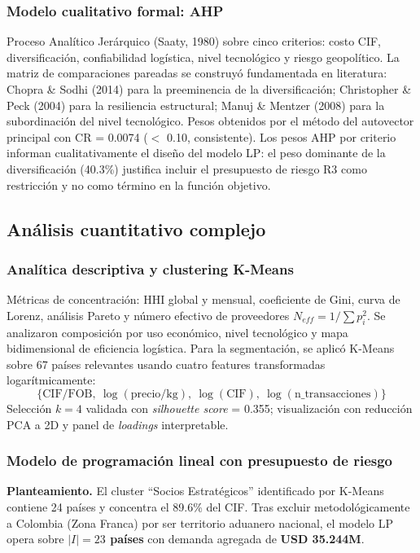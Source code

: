 \documentclass[11pt,a4paper]{article}
\begin{document}
\subsubsection{Modelo cualitativo formal: AHP}

Proceso Analítico Jerárquico (Saaty, 1980) sobre cinco criterios: costo CIF, diversificación, confiabilidad logística, nivel tecnológico y riesgo geopolítico. La matriz de comparaciones pareadas se construyó fundamentada en literatura: Chopra \& Sodhi (2014) para la preeminencia de la diversificación; Christopher \& Peck (2004) para la resiliencia estructural; Manuj \& Mentzer (2008) para la subordinación del nivel tecnológico. Pesos obtenidos por el método del autovector principal con CR = 0.0074 ($<$ 0.10, consistente). Los pesos AHP por criterio informan cualitativamente el diseño del modelo LP: el peso dominante de la diversificación (40.3\%) justifica incluir el presupuesto de riesgo R3 como restricción y no como término en la función objetivo.

\subsection{Análisis cuantitativo complejo}

\subsubsection{Analítica descriptiva y clustering K-Means}

Métricas de concentración: HHI global y mensual, coeficiente de Gini, curva de Lorenz, análisis Pareto y número efectivo de proveedores $N_{eff} = 1/\sum p_i^2$. Se analizaron composición por uso económico, nivel tecnológico y mapa bidimensional de eficiencia logística. Para la segmentación, se aplicó K-Means sobre 67 países relevantes usando cuatro features transformadas logarítmicamente:
$$
\{\text{CIF/FOB},\ \log(\text{precio/kg}),\ \log(\text{CIF}),\ \log(\text{n\_transacciones})\}
$$
Selección $k=4$ validada con \textit{silhouette score} = 0.355; visualización con reducción PCA a 2D y panel de \emph{loadings} interpretable.

\subsubsection{Modelo de programación lineal con presupuesto de riesgo}

\textbf{Planteamiento.} El cluster ``Socios Estratégicos'' identificado por K-Means contiene 24 países y concentra el 89.6\% del CIF. Tras excluir metodológicamente a Colombia (Zona Franca) por ser territorio aduanero nacional, el modelo LP opera sobre \textbf{$|I|=23$ países} con demanda agregada de \textbf{USD 35.244M}.
\end{document}
